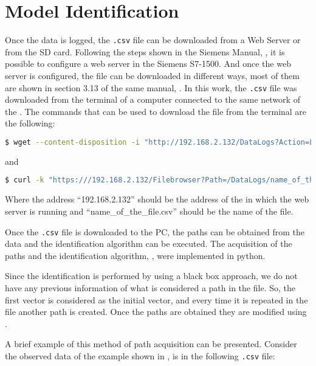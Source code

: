 \section{Model Identification}
\label{sec:modIdent}
 Once the data is logged, the \verb|.csv| file can be downloaded from a Web Server or from the SD card. Following the steps shown in the Siemens Manual,
\cite{webserverSiemens}, it is possible to configure a web server in the Siemens
\PLC{} S7-1500. And once the web server is configured, the file can be downloaded in different
ways, most of them are shown in section 3.13 of the same manual, \cite{webserverSiemens}. In this work, the \verb|.csv| file was downloaded from the terminal of a computer connected to the same network of the \PLC{}.
The commands that can be used to download the file from the terminal are the following:
\vspace{-1cm}
\begin{lstlisting}[language=bash,numbers=none]
  $ wget --content-disposition -i "http://192.168.2.132/DataLogs?Action=LIST"
\end{lstlisting}
and
\vspace{-1cm}
\begin{lstlisting}[language=bash,numbers=none]
  $ curl -k "https:///192.168.2.132/Filebrowser?Path=/DataLogs/name_of_the_file.csv&RAW" -H "Referer: https://192.168.2.132/Portal/Portal.mwsl?PriNav=Filebrowser&Path=/DataLogs/"
\end{lstlisting}
Where the address ``192.168.2.132'' should be the address of the \PLC{} in which
the web server is running and ``name\_of\_the\_file.csv'' should be the name of the file.

Once the \verb|.csv| file is downloaded to the PC, the paths can be obtained from the data and the identification algorithm can
be executed. The acquisition of the paths and the identification algorithm, , were
implemented in python.

Since the identification is
performed by using a black box approach, we do not have any previous information of what is
considered a path in the file. So, the first vector is considered as the initial
vector, and every time it is repeated in the file another path is created.
Once the paths are obtained they are modified using .

A brief example of this method of path acquisition can be presented. Consider the observed data of the example shown in , is in the following
\verb|.csv| file:

